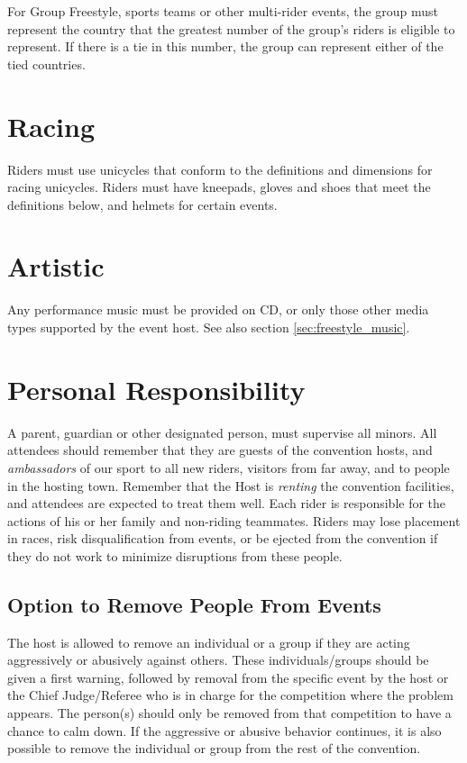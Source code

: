 For Group Freestyle, sports teams or other multi-rider events, the group must represent the country that the greatest number of the group's riders is eligible to represent.
If there is a tie in this number, the group can represent either of the tied countries.

\section{Racing}
Riders must use unicycles that conform to the definitions and dimensions for racing unicycles.
Riders must have kneepads, gloves and shoes that meet the definitions below, and helmets for certain events.

\section{Artistic}
Any performance music must be provided on CD, or only those other media types supported by the event host.
See also section \ref{sec:freestyle_music}.

\section{Personal Responsibility}
A parent, guardian or other designated person, must supervise all minors.
All attendees should remember that they are guests of the convention hosts, and \textit{ambassadors} of our sport to all new riders, visitors from far away, and to people in the hosting town.
Remember that the Host is \textit{renting} the convention facilities, and attendees are expected to treat them well.
Each rider is responsible for the actions of his or her family and non-riding teammates.
Riders may lose placement in races, risk disqualification from events, or be ejected from the convention if they do not work to minimize disruptions from these people.

\subsection{Option to Remove People From Events}
The host is allowed to remove an individual or a group if they are acting aggressively or abusively against others.
These individuals/groups should be given a first warning, followed by removal from the specific event by the host or the Chief Judge/Referee who is in charge for the competition where the problem appears.
The person(s) should only be removed from that competition to have a chance to calm down.
If the aggressive or abusive behavior continues, it is also possible to remove the individual or group from the rest of the convention.

